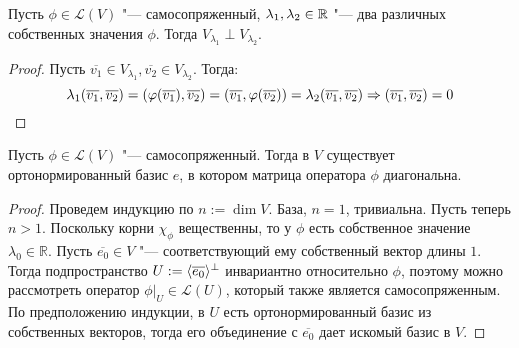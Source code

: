 \begin{proposition}
	Пусть $\phi \in \mathcal{L}(V)$ "--- самосопряженный, $\lambda_1, \lambda_2 \hm{\in} \mathbb{R}$ "--- два различных собственных значения $\phi$. Тогда $V_{\lambda_1} \perp V_{\lambda_2}$.
\end{proposition}

\begin{proof}
	Пусть $\overline{v_1} \in V_{\lambda_1}, \overline{v_2} \in V_{\lambda_2}$. Тогда:
	\[\lambda_1(\overline{v_1}, \overline{v_2}) = (\phi(\overline{v_1}), \overline{v_2}) = (\overline{v_1}, \phi(\overline{v_2})) = \lambda_2(\overline{v_1}, \overline{v_2}) \Rightarrow (\overline{v_1}, \overline{v_2}) = 0\qedhere\]
\end{proof}

\begin{theorem}
	Пусть $\phi \in \mathcal{L}(V)$ "--- самосопряженный. Тогда в $V$ существует ортонормированный базис $e$, в котором матрица оператора $\phi$ диагональна.
\end{theorem}

\begin{proof}
	Проведем индукцию по $n := \dim{V}$. База, $n = 1$, тривиальна. Пусть теперь $n > 1$. Поскольку корни $\chi_\phi$ вещественны, то у $\phi$ есть собственное значение $\lambda_0 \in \mathbb{R}$. Пусть $\overline{e_0} \in V$ "--- соответствующий ему собственный вектор длины $1$. Тогда подпространство $U \hm{:=} \langle\overline{e_0}\rangle^\perp$ инвариантно относительно $\phi$, поэтому можно рассмотреть оператор $\phi|_{U} \in \mathcal{L}(U)$, который также является самосопряженным. По предположению индукции, в $U$ есть ортонормированный базис из собственных векторов, тогда его объединение с $\overline{e_0}$ дает искомый базис в $V$.
\end{proof}

